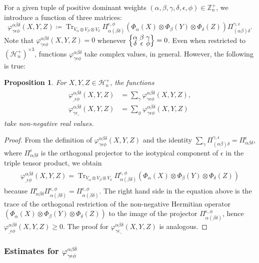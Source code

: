 \documentclass[notitlepage, 11pt, letterpaper]{amsart}
\theoremstyle{plain}
\newtheorem{prop}[thm]{Proposition}
\theoremstyle{definition}
\DeclareMathOperator{\Tr}{Tr}
\newcommand{\hermp}[1]{\mathcal H^{+}_{#1}}
\newcommand{\undomweightsp}[1]{\mathbb Z^{+}_{#1}}
\newcommand{\ot}{\otimes} %
\newcommand{\vp}{\varphi} %
\newcommand{\projl}{\Pi_{(\ya \yb) \yd}^{\yc, \ye}}
\newcommand{\projr}{\Pi_{\ya (\yb \yd)}^{\ye, \yf}}
\newcommand{\ya}{\alpha}
\newcommand{\yb}{\beta}
\newcommand{\yc}{\gamma}
\newcommand{\yd}{\delta}
\newcommand{\ye}{\epsilon}
\newcommand{\yf}{\phi}
\newcommand{\tightcurlysixj}[1]{
\begingroup
\arraycolsep=1.5pt
\renewcommand{\arraystretch}{0.3}
\left\{\!\begin{array}{ccc}
    #1
\end{array}\!\right\}
\endgroup
}
\newcommand{\abcdefsymbol}{\tightcurlysixj{\alpha & \beta & \gamma \\ \delta & \epsilon & \phi}}
\begin{document}
For a given tuple of positive dominant weights $(\ya,\yb,\yc,\yd,\ye,\yf) \in \undomweightsp{n}$, we introduce a function of three matrices:
\begin{equation}
    \vp^{\ya \yb \yd}_{\yc \ye \yf}(X, Y, Z)
    \coloneqq
    \Tr_{V_\ya \ot V_\yb \ot V_\yd}
    \projr (\Phi_\ya(X) \ot \Phi_\yb(Y) \ot \Phi_\yd(Z))\projl.
\end{equation}
Note that $\vp^{\ya \yb \yd}_{\yc \ye \yf}(X,Y,Z) = 0$ whenever $\abcdefsymbol = 0$.
Even when restricted to $(\hermp{n})^{\times 3}$, functions $\vp^{\ya \yb \yd}_{\yc \ye \yf}$ take complex values, in general.
However, the following is true:
\begin{prop}
    \label{prop:non_neg_partial}
    For $X,Y,Z \in \hermp{n}$, the functions
    \begin{align}
        \begin{split}
            \vp^{\ya\yb\yd}_{\_ \ye\yf}(X,Y,Z) & = \sum_{\yc}\vp^{\ya\yb\yd}_{\yc\ye\yf}(X,Y,Z), \\
            \vp^{\ya\yb\yd}_{\yc\ye \_}(X,Y,Z) & = \sum_{\yf}\vp^{\ya\yb\yd}_{\yc\ye\yf}(X,Y,Z)
        \end{split}
    \end{align}
    take non-negative real values.
\end{prop}
\begin{proof}
    From the definition of $\vp^{\ya \yb \yd}_{\yc \ye \yf}(X, Y, Z)$ and the identity $\sum_\yc \projl = \Pi^\ye_{\ya \yb \yd}$, where $\Pi^\ye_{\ya \yb \yd}$ is the orthogonal projector to the isotypical component of $\ye$ in the triple tensor product, we obtain
    \begin{align}
        \begin{split}
            \vp^{\ya\yb\yd}_{\_ \ye\yf}(X,Y,Z)
            =
            \Tr_{V_\ya \ot V_\yb \ot V_\yd} \projr (\Phi_\ya(X) \ot \Phi_\yb(Y) \ot \Phi_\yd(Z))
        \end{split}
    \end{align}
    because $\Pi^\ye_{\ya \yb \yd} \projr = \projr$.
    The right hand side in the equation above is the trace of the orthogonal restriction of the non-negative Hermitian operator $(\Phi_\ya(X) \ot \Phi_\yb(Y) \ot \Phi_\yd(Z))$ to the image of the projector $\projr$, hence $\vp^{\ya\yb\yd}_{\_ \ye\yf}(X,Y,Z) \geq 0$.
    The proof for $\vp^{\ya\yb\yd}_{\yc\ye \_}(X,Y,Z)$ is analogous.
\end{proof}

\subsubsection{Estimates for \texorpdfstring{$\vp^{\ya \yb \yd}_{\yc \ye \yf}$}{phiabcdef}}
\end{document}
